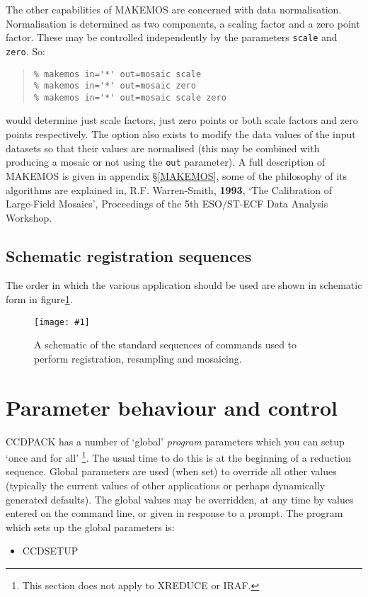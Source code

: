 \documentclass[twoside,11pt]{article}
\newcommand{\htmladdimg}[1]{}
\newcommand{\hyperref}[4]{#2\ref{#4}#3}
\renewcommand{\_}{\texttt{\symbol{95}}}
\newenvironment{myquote}{\begin{quote}\begin{small}}{\end{small}\end{quote}}
\newcommand{\text}[1]{{\small \tt #1}}
\newcommand{\routine}[1]{{\sc #1}}
\newcommand{\myfig} [5] {
  \begin{figure}
    \centering\texttt{[image: \#1]}
    \typeout{#1 inserted on page \arabic{page}}
    \caption{\label{#4}#5}
  \end{figure}
  }
\newcommand{\myfig}[5]{
    \htmladdimg{#3}\\
    Figure: \label{#4} #5
    }
\begin{document}
The other capabilities of \routine{MAKEMOS} are concerned with data normalisation.
Normalisation is determined as two components, a scaling factor and a
zero point factor. These may be controlled independently by the
parameters \text{scale} and \text{zero}. So:
\begin{myquote}
\begin{verbatim}
% makemos in='*' out=mosaic scale
% makemos in='*' out=mosaic zero
% makemos in='*' out=mosaic scale zero
\end{verbatim}
\end{myquote}
would determine just scale factors, just zero points or both scale
factors and zero points respectively. The option also exists to modify
the data values of the input datasets so that their values are
normalised (this may be combined with producing a mosaic or not using
the \text{out} parameter). A full description of \routine{MAKEMOS}
is given in appendix \S\ref{MAKEMOS}, some of the philosophy of
its algorithms are explained in, R.F. Warren-Smith, {\bf 1993},
`The Calibration of Large-Field Mosaics', Proceedings of the 5th
ESO/ST-ECF Data Analysis Workshop.

\subsection{Schematic registration sequences}
The order in which the various application should be used are shown in
schematic form in \hyperref{the following figure}{figure}{}{registration}.

\myfig{sun139reg.eps}{height=0.85\textheight}{reg.gif}{registration}
{A schematic of the standard sequences of commands used to perform
registration, resampling and mosaicing.}

\clearpage

\section{Parameter behaviour and control}

CCDPACK has a number of `global' {\em program} parameters which you
can setup `once and for all'
\footnote{This section does not apply to \routine{XREDUCE} or IRAF.}.
The usual time to do this is at the beginning of a
reduction sequence.
Global parameters are used (when set) to override all other values
(typically the current values of other applications or perhaps
dynamically generated defaults). The global values may be overridden,
at any time by values entered on the command line, or given in
response to a prompt. The program which sets up the global parameters is:
\begin{itemize}
\item \routine{CCDSETUP}
\end{itemize}
\end{document}
